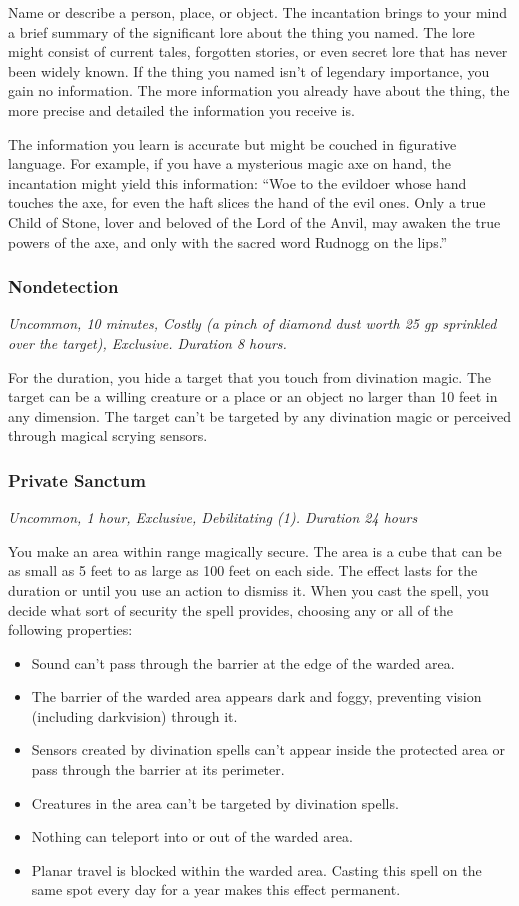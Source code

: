 Name or describe a person, place, or object. The incantation brings to your mind a brief summary of the significant lore about the thing you named. The lore might consist of current tales, forgotten stories, or even secret lore that has never been widely known. If the thing you named isn't of legendary importance, you gain no information. The more information you already have about the thing, the more precise and detailed the information you receive is.

The information you learn is accurate but might be couched in figurative language. For example, if you have a mysterious magic axe on hand, the incantation might yield this information: “Woe to the evildoer whose hand touches the axe, for even the haft slices the hand of the evil ones. Only a true Child of Stone, lover and beloved of the Lord of the Anvil, may awaken the true powers of the axe, and only with the sacred word Rudnogg on the lips.”

\subsubsection{Nondetection}
\textit{Uncommon, 10 minutes, Costly (a pinch of diamond dust worth 25 gp sprinkled over the target), Exclusive. Duration 8 hours.}

For the duration, you hide a target that you touch from divination magic. The target can be a willing creature or a place or an object no larger than 10 feet in any dimension. The target can't be targeted by any divination magic or perceived through magical scrying sensors.

\subsubsection{Private Sanctum}
\textit{Uncommon, 1 hour, Exclusive, Debilitating (1). Duration 24 hours}

You make an area within range magically secure. The area is a cube that can be as small as 5 feet to as large as 100 feet on each side. The effect lasts for the duration or until you use an action to dismiss it. When you cast the spell, you decide what sort of security the spell provides, choosing any or all of the following properties:
\begin{itemize}
\item Sound can't pass through the barrier at the edge of the warded area.
\item The barrier of the warded area appears dark and foggy, preventing vision (including darkvision) through it.
\item Sensors created by divination spells can't appear inside the protected area or pass through the barrier at its perimeter.
\item Creatures in the area can't be targeted by divination spells.
\item Nothing can teleport into or out of the warded area.
\item Planar travel is blocked within the warded area. Casting this spell on the same spot every day for a year makes this effect permanent.
\end{itemize}

